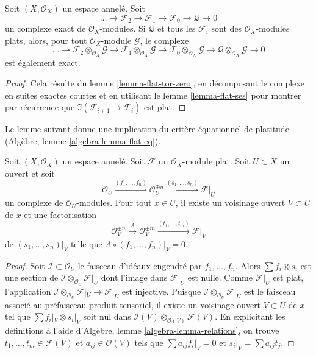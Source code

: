 \begin{lemma}
\label{lemma-flat-resolution-of-flat}
Soit $(X, \mathcal{O}_X)$ un espace annelé.
Soit
$$
\ldots \to
\mathcal{F}_2 \to
\mathcal{F}_1 \to
\mathcal{F}_0 \to
\mathcal{Q} \to 0
$$
un complexe exact de $\mathcal{O}_X$-modules.
Si $\mathcal{Q}$ et tous les $\mathcal{F}_i$ sont des $\mathcal{O}_X$-modules plats,
alors, pour tout $\mathcal{O}_X$-module $\mathcal{G}$, le complexe
$$
\ldots \to
\mathcal{F}_2 \otimes_{\mathcal{O}_X} \mathcal{G} \to
\mathcal{F}_1 \otimes_{\mathcal{O}_X} \mathcal{G} \to
\mathcal{F}_0 \otimes_{\mathcal{O}_X} \mathcal{G} \to
\mathcal{Q} \otimes_{\mathcal{O}_X} \mathcal{G} \to 0
$$
est également exact.
\end{lemma}

\begin{proof}
Cela résulte du lemme \ref{lemma-flat-tor-zero}, en décomposant le complexe
en suites exactes courtes et en utilisant le lemme \ref{lemma-flat-ses} pour
montrer par récurrence que $\Im(\mathcal{F}_{i + 1} \to \mathcal{F}_i)$
est plat.
\end{proof}

\noindent
Le lemme suivant donne une implication du critère équationnel de
platitude (Algèbre, lemme \ref{algebra-lemma-flat-eq}).

\begin{lemma}
\label{lemma-flat-eq}
Soit $(X, \mathcal{O}_X)$ un espace annelé. Soit $\mathcal{F}$ un
$\mathcal{O}_X$-module plat. Soit $U \subset X$ un ouvert et soit
$$
\mathcal{O}_U \xrightarrow{(f_1, \ldots, f_n)}
\mathcal{O}_U^{\oplus n} \xrightarrow{(s_1, \ldots, s_n)}
\mathcal{F}|_U
$$
un complexe de $\mathcal{O}_U$-modules. Pour tout $x \in U$, il
existe un voisinage ouvert $V \subset U$ de $x$ et une factorisation
$$
\mathcal{O}_V^{\oplus n}
\xrightarrow{A}
\mathcal{O}_V^{\oplus m} \xrightarrow{(t_1, \ldots, t_m)}
\mathcal{F}|_V
$$
de $(s_1, \ldots, s_n)|_V$ telle que $A \circ (f_1, \ldots, f_n)|_V = 0$.
\end{lemma}

\begin{proof}
Soit $\mathcal{I} \subset \mathcal{O}_U$ le faisceau d'idéaux
engendré par $f_1, \ldots, f_n$. Alors $\sum f_i \otimes s_i$ est
une section de $\mathcal{I} \otimes_{\mathcal{O}_U} \mathcal{F}|_U$
dont l'image dans $\mathcal{F}|_U$ est nulle. Comme $\mathcal{F}|_U$ est plat,
l'application
$\mathcal{I} \otimes_{\mathcal{O}_U} \mathcal{F}|_U \to \mathcal{F}|_U$
est injective. Puisque $\mathcal{I} \otimes_{\mathcal{O}_U} \mathcal{F}|_U$
est le faisceau associé au préfaisceau produit tensoriel, il existe
un voisinage ouvert $V \subset U$ de $x$ tel
que $\sum f_i|_V \otimes s_i|_V$ soit nul dans
$\mathcal{I}(V) \otimes_{\mathcal{O}(V)} \mathcal{F}(V)$.
En explicitant les définitions à l'aide d'Algèbre, lemme \ref{algebra-lemma-relations},
on trouve $t_1, \ldots, t_m \in \mathcal{F}(V)$ et $a_{ij} \in \mathcal{O}(V)$
tels que $\sum a_{ij}f_i|_V = 0$ et $s_i|_V = \sum a_{ij}t_j$.
\end{proof}














